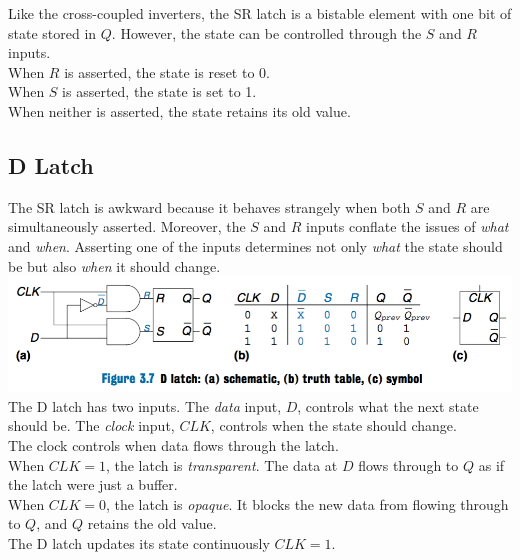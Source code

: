 \documentclass[12pt]{article}
\theoremstyle{definition}
\begin{document}
  Like the cross-coupled inverters, the SR latch is a bistable element with one bit of state stored in $Q$.
  However, the state can be controlled through the $S$ and $R$ inputs. \\
  When $R$ is asserted, the state is reset to 0. \\
  When $S$ is asserted, the state is set to 1. \\
  When neither is asserted, the state retains its old value.

  \subsection{D Latch}
  The SR latch is awkward because it behaves strangely when both $S$ and $R$ are simultaneously asserted.
  Moreover, the $S$ and $R$ inputs conflate the issues of \emph{what} and \emph{when}.
  Asserting one of the inputs determines not only \emph{what} the state should be but also \emph{when} it should change. \\
  \includegraphics[width=1.0\textwidth]{pictures/dLatch.png}\\
  The D latch has two inputs.
  The \emph{data} input, $D$, controls what the next state should be.
  The \emph{clock} input, $CLK$, controls when the state should change. \\
  The clock controls when data flows through the latch. \\
  When $CLK = 1$, the latch is \emph{transparent}.
  The data at $D$ flows through to $Q$ as if the latch were just a buffer. \\
  When $CLK = 0$, the latch is \emph{opaque}.
  It blocks the new data from flowing through to $Q$, and $Q$ retains the old value. \\
  The D latch updates its state continuously $CLK = 1$.
  \newpage
\end{document}
